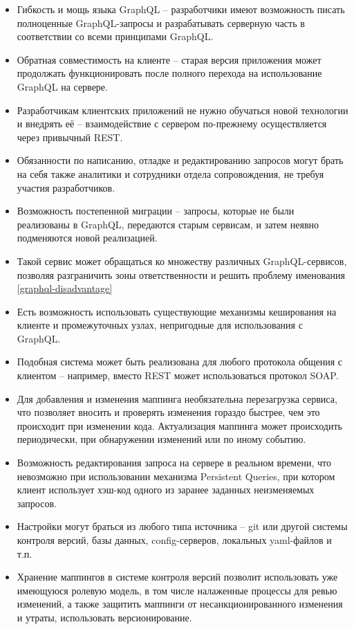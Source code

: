 \begin{itemize}
    \item Гибкость и мощь языка GraphQL – разработчики имеют возможность писать полноценные GraphQL-запросы и разрабатывать серверную часть в соответствии со всеми принципами GraphQL\@.
    \item Обратная совместимость на клиенте – старая версия приложения может продолжать функционировать после полного перехода на использование GraphQL на сервере.
    \item Разработчикам клиентских приложений не нужно обучаться новой технологии и внедрять её – взаимодействие с сервером по-прежнему осуществляется через привычный REST\@.
    \item Обязанности по написанию, отладке и редактированию запросов могут брать на себя также аналитики и сотрудники отдела сопровождения, не требуя участия разработчиков.
    \item Возможность постепенной миграции – запросы, которые не были реализованы в GraphQL, передаются старым сервисам, и затем неявно подменяются новой реализацией.
    \item Такой сервис может обращаться ко множеству различных GraphQL-сервисов, позволяя разграничить зоны ответственности и решить проблему именования \ref{graphql-disadvantage} %
    \item Есть возможность использовать существующие механизмы кеширования на клиенте и промежуточных узлах, непригодные для использования с GraphQL\@.
    \item Подобная система может быть реализована для любого протокола общения с клиентом – например, вместо REST может использоваться протокол SOAP\@.
    \item Для добавления и изменения маппинга необязательна перезагрузка сервиса, что позволяет вносить и проверять изменения гораздо быстрее, чем это происходит при изменении кода.
    Актуализация маппинга может происходить периодически, при обнаружении изменений или по иному событию.
    \item Возможность редактирования запроса на сервере в реальном времени, что невозможно при использовании механизма Persistent Queries, при котором клиент использует хэш-код одного из заранее заданных неизменяемых запросов.
    \item Настройки могут браться из любого типа источника – git или другой системы контроля версий, базы данных, config-серверов, локальных yaml-файлов и т.п.
    \item Хранение маппингов в системе контроля версий позволит использовать уже имеющуюся ролевую модель, в том числе налаженные процессы для ревью изменений, а также защитить маппинги от несанкционированного изменения и утраты, использовать версионирование.

\end{itemize}
